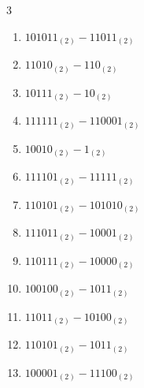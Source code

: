 \begin{multicols}{3}
\begin{enumerate}
\columnbreak %

\resetques

  \item $101011_{(2)} - 11011_{(2)}$


  \item $11010_{(2)} - 110_{(2)}$


  \item $10111_{(2)} - 10_{(2)}$


  \item $111111_{(2)} - 110001_{(2)}$


  \item $10010_{(2)} - 1_{(2)}$


  \item $111101_{(2)} - 11111_{(2)}$


  \item $110101_{(2)} - 101010_{(2)}$


  \item $111011_{(2)} - 10001_{(2)}$


  \item $110111_{(2)} - 10000_{(2)}$


  \item $100100_{(2)} - 1011_{(2)}$


\columnbreak %

  \item $11011_{(2)} - 10100_{(2)}$


  \item $110101_{(2)} - 1011_{(2)}$


  \item $100001_{(2)} - 11100_{(2)}$



\end{enumerate}
\end{multicols}
